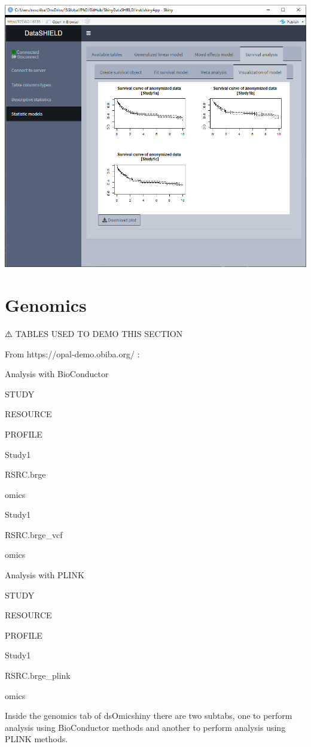 \documentclass[
]{book}
\begin{document}
\includegraphics{images/survival6.png}

\hypertarget{genomics}{%
\section{Genomics}\label{genomics}}

⚠️ TABLES USED TO DEMO THIS SECTION

From https://opal-demo.obiba.org/ :

Analysis with BioConductor

STUDY

RESOURCE

PROFILE

Study1

RSRC.brge

omics

Study1

RSRC.brge\_vcf

omics

Analysis with PLINK

STUDY

RESOURCE

PROFILE

Study1

RSRC.brge\_plink

omics

Inside the genomics tab of dsOmicshiny there are two subtabs, one to perform analysis using BioConductor methods and another to perform analysis using PLINK methods.
\end{document}
